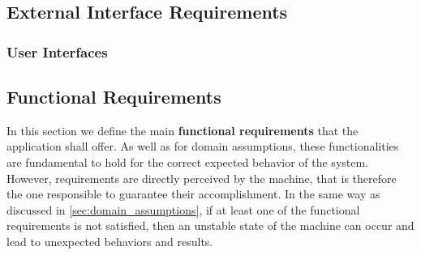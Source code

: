 \subsection{External Interface Requirements}
\label{sec:ex_interface_req}
\subsubsection{User Interfaces}


\subsection{Functional Requirements}
\label{sec:fun_req}
In this section we define the main \textbf{functional requirements} that the application shall offer. As well as for domain assumptions, these functionalities are fundamental to hold for the correct expected behavior of the system. However, requirements are directly perceived by the machine, that is therefore the one responsible to guarantee their accomplishment. In the same way as discussed in \ref{sec:domain_assumptions}, if at least one of the functional requirements is not satisfied, then an unstable state of the machine can occur and lead to unexpected behaviors and results.


